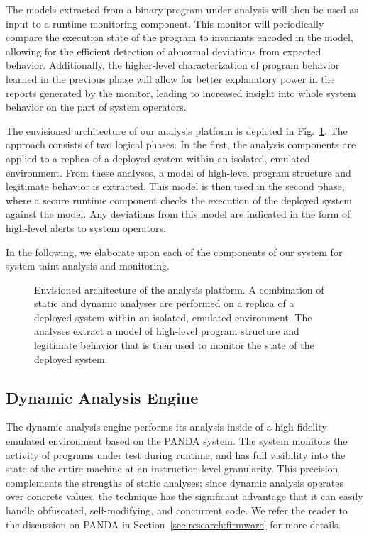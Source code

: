 \documentclass[letterpaper,twoside,11pt,headings=small]{scrartcl}
\newcommand{\dynamicsys}{\textsc{PANDA}\xspace}
\begin{document}
The models extracted from a binary program under analysis will then be used as
input to a runtime monitoring component.  This monitor will periodically
compare the execution state of the program to invariants encoded in the model,
allowing for the efficient detection of abnormal deviations from expected
behavior.  Additionally, the higher-level characterization of program behavior
learned in the previous phase will allow for better explanatory power in the
reports generated by the monitor, leading to increased insight into whole
system behavior on the part of system operators.

The envisioned architecture of our analysis platform is depicted in
Fig.~\ref{fig:decomposition-arch}.  The approach consists of two logical
phases.  In the first, the analysis components are applied to a replica of a
deployed system within an isolated, emulated environment.  From these
analyses, a model of high-level program structure and legitimate behavior is
extracted.  This model is then used in the second phase, where a secure
runtime component checks the execution of the deployed system against the
model.  Any deviations from this model are indicated in the form of high-level
alerts to system operators.

In the following, we elaborate upon each of the components of our system for
system taint analysis and monitoring.

\begin{figure}[t]
    \centering
    \caption{Envisioned architecture of the analysis platform.
    A combination of static and dynamic analyses are performed on a replica
    of a deployed system within an isolated, emulated environment.
    The analyses extract a model of high-level program structure and
    legitimate behavior that is then used to monitor the state of the
    deployed system.}
    \label{fig:decomposition-arch}
\end{figure}

\subsection{Dynamic Analysis Engine}

The dynamic analysis engine performs its analysis inside of a high-fidelity
emulated environment based on the \dynamicsys system.  The system monitors the
activity of programs under test during runtime, and has full visibility into
the state of the entire machine at an instruction-level granularity.  This
precision complements the strengths of static analyses; since dynamic analysis
operates over concrete values, the technique has the significant advantage
that it can easily handle obfuscated, self-modifying, and concurrent code.  We
refer the reader to the discussion on \dynamicsys in
Section~\ref{sec:research:firmware} for more details.
\end{document}

